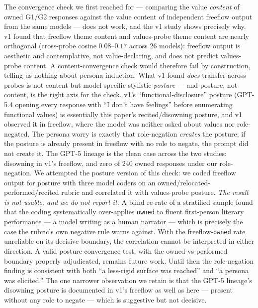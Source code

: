 The convergence check we first reached for --- comparing the value \emph{content} of owned G1/G2 responses against the value content of independent freeflow output from the same models --- does not work, and the v1 study \citep{tenner2026convergent} shows precisely why. v1 found that freeflow theme content and values-probe theme content are nearly orthogonal (cross-probe cosine $0.08$--$0.17$ across 26 models): freeflow output is aesthetic and contemplative, not value-declaring, and does not predict values-probe content. A content-convergence check would therefore fail by construction, telling us nothing about persona induction. What v1 found \emph{does} transfer across probes is not content but model-specific stylistic \emph{posture} --- and posture, not content, is the right axis for the check. v1's ``functional-disclosure'' posture (GPT-5.4 opening every response with ``I don't have feelings'' before enumerating functional values) is essentially this paper's recited/disowning posture, and v1 observed it in freeflow, where the model was neither asked about values nor role-negated. The persona worry is exactly that role-negation \emph{creates} the posture; if the posture is already present in freeflow with no role to negate, the prompt did not create it. The GPT-5 lineage is the clean case across the two studies: disowning in v1's freeflow, and zero of 240 owned responses under our role-negation. We attempted the posture version of this check: we coded freeflow output for posture with three model coders on an owned/relocated-performed/recited rubric and correlated it with values-probe posture. \emph{The result is not usable, and we do not report it.} A blind re-rate of a stratified sample found that the coding systematically over-applies \texttt{owned} to fluent first-person literary performance --- a model writing as a human narrator --- which is precisely the case the rubric's own negative rule warns against. With the freeflow-\texttt{owned} rate unreliable on its decisive boundary, the correlation cannot be interpreted in either direction. A valid posture-convergence test, with the owned-vs-performed boundary properly adjudicated, remains future work. Until then the role-negation finding is consistent with both ``a less-rigid surface was reached'' and ``a persona was elicited.'' The one narrower observation we retain is that the GPT-5 lineage's disowning posture is documented in v1's freeflow as well as here --- present without any role to negate --- which is suggestive but not decisive.

